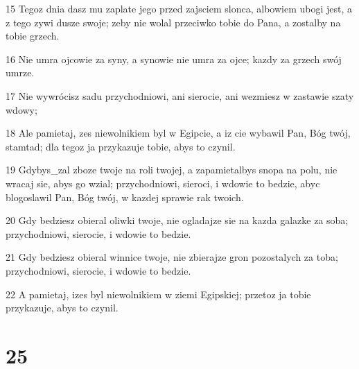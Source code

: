 \par 15 Tegoz dnia dasz mu zaplate jego przed zajsciem slonca, albowiem ubogi jest, a z tego zywi dusze swoje; zeby nie wolal przeciwko tobie do Pana, a zostalby na tobie grzech.
\par 16 Nie umra ojcowie za syny, a synowie nie umra za ojce; kazdy za grzech swój umrze.
\par 17 Nie wywrócisz sadu przychodniowi, ani sierocie, ani wezmiesz w zastawie szaty wdowy;
\par 18 Ale pamietaj, zes niewolnikiem byl w Egipcie, a iz cie wybawil Pan, Bóg twój, stamtad; dla tegoz ja przykazuje tobie, abys to czynil.
\par 19 Gdybys_zal zboze twoje na roli twojej, a zapamietalbys snopa na polu, nie wracaj sie, abys go wzial; przychodniowi, sieroci, i wdowie to bedzie, abyc blogoslawil Pan, Bóg twój, w kazdej sprawie rak twoich.
\par 20 Gdy bedziesz obieral oliwki twoje, nie ogladajze sie na kazda galazke za soba; przychodniowi, sierocie, i wdowie to bedzie.
\par 21 Gdy bedziesz obieral winnice twoje, nie zbierajze gron pozostalych za toba; przychodniowi, sierocie, i wdowie to bedzie.
\par 22 A pamietaj, izes byl niewolnikiem w ziemi Egipskiej; przetoz ja tobie przykazuje, abys to czynil.

\chapter{25}

